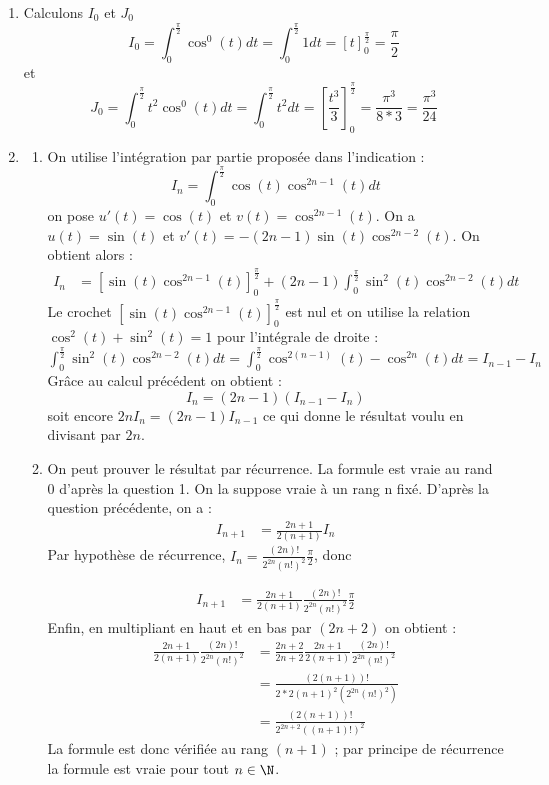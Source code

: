\begin{correction}
\begin{enumerate}
\item Calculons $I_0$ et $J_0$
 $$I_0  = \int_0^{\frac{\pi}{2}} \cos^{0}(t) dt = \int_0^{\frac{\pi}{2}} 1dt= \left[t \right]_0^{\frac{\pi}{2}} =\frac{\pi}{2}$$
et 
 $$J_0  = \int_0^{\frac{\pi}{2}} t^2\cos^{0}(t) dt = \int_0^{\frac{\pi}{2}} t^2dt= \left[\frac{t^3}{3} \right]_0^{\frac{\pi}{2}} =\frac{\pi^3}{8*3}=\frac{\pi^3}{24}$$
\item 
\begin{enumerate}
\item 

On utilise l'intégration par partie proposée dans l'indication : 
$$I_n  =  \int_0^{\frac{\pi}{2}}  \cos(t) \cos^{2n-1} (t) dt $$
on pose $u'(t)= \cos(t) $ et $v(t) =\cos^{2n-1}(t)$. On a $u(t)= \sin(t)$ et $v'(t) = -(2n-1) \sin(t) \cos^{2n-2}(t)$. On obtient alors : 
\begin{align*}
I_n &= \left[ \sin(t) \cos^{2n-1}(t)\right]_0^{\frac{\pi}{2}}  +(2n-1) \int_0^{\frac{\pi}{2}}  \sin^2(t) \cos^{2n-2} (t)dt
\end{align*}
Le crochet $\left[ \sin(t) \cos^{2n-1}(t)\right]_0^{\frac{\pi}{2}}$ est nul et on utilise la relation $\cos^2(t) + \sin^2(t) =1$ pour l'intégrale de droite : 
$\int_0^{\frac{\pi}{2}}  \sin^2(t) \cos^{2n-2} (t)dt =  \int_0^{\frac{\pi}{2}}  \cos^{2(n-1)} (t)- \cos^{2n}(t)dt = I_{n-1} -I_n$
Grâce au calcul précédent on obtient : 
$$I_n = (2n-1)(I_{n-1} -I_n)$$ 
soit encore $2nI_n = (2n-1) I_{n-1}$ ce qui donne le résultat voulu en divisant par $2n$. 

\item On peut prouver le résultat par récurrence.  La formule est vraie au rand 0 d'après la question 1. On la suppose vraie à un rang n fixé. D'après la question précédente, on a : 
\begin{align*}
I_{n+1} &= \frac{2n+1}{2(n+1)} I_{n}
\end{align*}
Par hypothèse de récurrence,  $I_n =  \frac{(2n)! }{2^{2n} (n!)^2} \frac{\pi}{2}$, donc 

\begin{align*}
I_{n+1} &= \frac{2n+1}{2(n+1)} \frac{(2n)! }{2^{2n} (n!)^2} \frac{\pi}{2}
\end{align*}
Enfin, en multipliant en haut et en bas par $(2n+2)$ on obtient : 
\begin{align*}
\frac{2n+1}{2(n+1)} \frac{(2n)! }{2^{2n} (n!)^2}  &=  \frac{2n+2}{2n+2}\frac{2n+1}{2(n+1)} \frac{(2n)! }{2^{2n} (n!)^2} \\
&= \frac{(2(n+1))!}{ 2*2 (n+1)^2 (2^{2n} (n!)^2)}\\
&= \frac{(2(n+1))!}{ 2^{2n+2} ((n+1)!)^2}
\end{align*}
La formule est donc vérifiée au rang $(n+1)$ ; par principe de récurrence la formule est vraie pour tout $n\in \N$. 


\end{enumerate}
\end{enumerate}
\end{correction}
